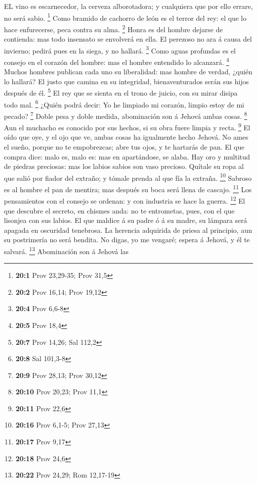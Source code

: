  EL vino es escarnecedor, la cerveza alborotadora; y
cualquiera que por ello errare, no será sabio. \footnote{\textbf{20:1}
  Prov 23,29-35; Prov 31,5}  Como bramido de cachorro de
león es el terror del rey: el que lo hace enfurecerse, peca contra su
alma. \footnote{\textbf{20:2} Prov 16,14; Prov 19,12}  Honra
es del hombre dejarse de contienda: mas todo insensato se envolverá en
ella.  El perezoso no ara á causa del invierno; pedirá pues
en la siega, y no hallará. \footnote{\textbf{20:4} Prov 6,6-8}
 Como aguas profundas es el consejo en el corazón del
hombre: mas el hombre entendido lo alcanzará. \footnote{\textbf{20:5}
  Prov 18,4}  Muchos hombres publican cada uno su
liberalidad: mas hombre de verdad, ¿quién lo hallará?  El
justo que camina en su integridad, bienaventurados serán sus hijos
después de él. \footnote{\textbf{20:7} Prov 14,26; Sal 112,2}
 El rey que se sienta en el trono de juicio, con su mirar
disipa todo mal. \footnote{\textbf{20:8} Sal 101,3-8} 
¿Quién podrá decir: Yo he limpiado mi corazón, limpio estoy de mi
pecado? \footnote{\textbf{20:9} Prov 28,13; Prov 30,12} 
Doble pesa y doble medida, abominación son á Jehová ambas cosas.
\footnote{\textbf{20:10} Prov 20,23; Prov 11,1}  Aun el
muchacho es conocido por sus hechos, si su obra fuere limpia y recta.
\footnote{\textbf{20:11} Prov 22,6}  El oído que oye, y el
ojo que ve, ambas cosas ha igualmente hecho Jehová.  No
ames el sueño, porque no te empobrezcas; abre tus ojos, y te hartarás de
pan.  El que compra dice: malo es, malo es: mas en
apartándose, se alaba.  Hay oro y multitud de piedras
preciosas: mas los labios sabios son vaso precioso. 
Quítale su ropa al que salió por fiador del extraño; y tómale prenda al
que fía la extraña. \footnote{\textbf{20:16} Prov 6,1-5; Prov 27,13}
 Sabroso es al hombre el pan de mentira; mas después su
boca será llena de cascajo. \footnote{\textbf{20:17} Prov 9,17}
 Los pensamientos con el consejo se ordenan: y con
industria se hace la guerra. \footnote{\textbf{20:18} Prov 24,6}
 El que descubre el secreto, en chismes anda: no te
entrometas, pues, con el que lisonjea con sus labios.  El
que maldice á su padre ó á su madre, su lámpara será apagada en
oscuridad tenebrosa.  La herencia adquirida de priesa al
principio, aun su postrimería no será bendita.  No digas,
yo me vengaré; espera á Jehová, y él te salvará. \footnote{\textbf{20:22}
  Prov 24,29; Rom 12,17-19}  Abominación son á Jehová las
